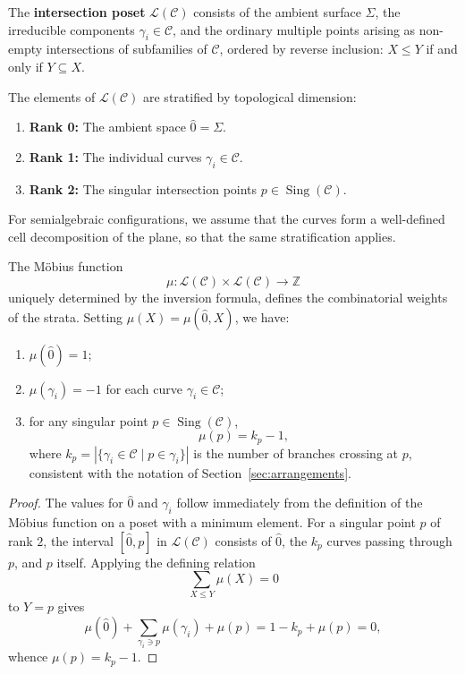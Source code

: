 \documentclass[article,11pt]{amsart} \numberwithin{equation}{section}
\numberwithin{equation}{section}
\begin{document}
{\begin{df}
	The \textbf{intersection poset} $\mathcal{L}(\mathcal{C})$ consists of the ambient
	surface $\Sigma$, the irreducible components $\gamma_i \in \mathcal{C}$,
	and the ordinary multiple points arising as non-empty intersections of
	subfamilies of $\mathcal{C}$, ordered by reverse inclusion: $X \le Y$
	if and only if $Y \subseteq X$.
	
	The elements of $\mathcal{L}(\mathcal{C})$ are stratified by topological dimension:
	\begin{enumerate}
		\item[\rm(i)]   \textbf{Rank 0:} The ambient space $\hat{0} = \Sigma$.
		\item[\rm(ii)]  \textbf{Rank 1:} The individual curves
		$\gamma_i \in \mathcal{C}$.
		\item[\rm(iii)] \textbf{Rank 2:} The singular intersection points
		$p \in \operatorname{Sing}(\mathcal{C})$.
	\end{enumerate}
	For semialgebraic configurations, we assume that the curves form a
	well-defined cell decomposition of the plane, so that the same
	stratification applies.
\end{df}

\begin{inp}
	\label{prop:mobius_curves}
	The Möbius function 
	\[ \mu : \mathcal{L}(\mathcal{C}) \times \mathcal{L}(\mathcal{C})
	\longrightarrow \mathbb{Z}
	\]
	uniquely determined by the inversion formula, defines
	the combinatorial weights of the strata. Setting
	$\mu(X) = \mu(\hat{0}, X)$, we have:
	\begin{enumerate}
		\item[\rm(i)]   $\mu(\hat{0}) = 1$;
		\item[\rm(ii)]  $\mu(\gamma_i) = -1$ for each curve
		$\gamma_i \in \mathcal{C}$;
		\item[\rm(iii)] for any singular point
		$p \in \operatorname{Sing}(\mathcal{C})$,
		\[
		\mu(p) = k_p - 1,
		\]
		where $k_p = |\{\gamma_i \in \mathcal{C}
		\mid p \in \gamma_i\}|$ is the number of branches
		crossing at $p$, consistent with the notation of
		Section~\ref{sec:arrangements}.
	\end{enumerate}
\end{inp}

\begin{proof}
	The values for $\hat{0}$ and $\gamma_i$ follow immediately from the
	definition of the Möbius function on a poset with a minimum element.
	For a singular point $p$ of rank $2$, the interval $[\hat{0}, p]$
	in $\mathcal{L}(\mathcal{C})$ consists of $\hat{0}$, the $k_p$ curves passing
	through $p$, and $p$ itself. Applying the defining relation
	\[
	\sum_{X \le Y} \mu(X) = 0
	\]
	to $Y = p$ gives
	\[
	\mu(\hat{0}) + \sum_{\gamma_i \ni p} \mu(\gamma_i) + \mu(p)
	= 1 - k_p + \mu(p) = 0,
	\]
	whence $\mu(p) = k_p - 1$.
\end{proof}

}
\end{document}
